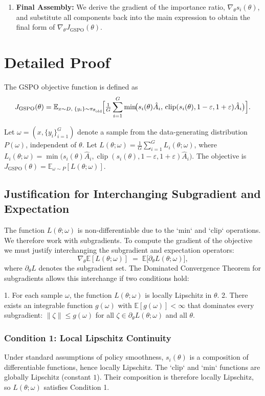 \documentclass{article}
\begin{document}
\begin{enumerate}
    \item \textbf{Final Assembly:} We derive the gradient of the importance ratio, $\nabla_\theta s_i(\theta)$, and substitute all components back into the main expression to obtain the final form of $\nabla_\theta J_{\text{GSPO}}(\theta)$.
\end{enumerate}
\section{Detailed Proof}

The GSPO objective function is defined as
$$
J_{\text{GSPO}}(\theta)=
\mathbb{E}_{x \sim D,\;\{y_i\}\sim\pi_{\theta_{\text{old}}}}
\!\Bigl[
\tfrac{1}{G}\sum_{i=1}^G
\min\!\bigl(
  s_i(\theta)\hat{A}_i,\,
  \operatorname{clip}(s_i(\theta),1-\varepsilon,1+\varepsilon)\hat{A}_i
\bigr)
\Bigr].
$$

Let $\omega=(x,\{y_i\}_{i=1}^G)$ denote a sample from the data-generating distribution $P(\omega)$, independent of $\theta$. Let  
$L(\theta;\omega)=\tfrac{1}{G}\sum_{i=1}^G L_i(\theta;\omega)$, where  
$L_i(\theta;\omega)=\min\!\bigl(s_i(\theta)\hat{A}_i,\operatorname{clip}(s_i(\theta),1-\varepsilon,1+\varepsilon)\hat{A}_i\bigr)$.  
The objective is $J_{\text{GSPO}}(\theta)=\mathbb{E}_{\omega\sim P}[L(\theta;\omega)]$.

\subsection{Justification for Interchanging Subgradient and Expectation}

The function $L(\theta;\omega)$ is non-differentiable due to the `min` and `clip` operations. We therefore work with subgradients. To compute the gradient of the objective we must justify interchanging the subgradient and expectation operators:
\[
\nabla_\theta\mathbb{E}[L(\theta;\omega)]
\;=\;
\mathbb{E}\!\bigl[\partial_\theta L(\theta;\omega)\bigr],
\]
where $\partial_\theta L$ denotes the subgradient set. The Dominated Convergence Theorem for subgradients allows this interchange if two conditions hold:

1. For each sample $\omega$, the function $L(\theta;\omega)$ is locally Lipschitz in $\theta$.  
2. There exists an integrable function $g(\omega)$ with $\mathbb{E}[g(\omega)]<\infty$ that dominates every subgradient: $\|\zeta\|\le g(\omega)$ for all $\zeta\in\partial_\theta L(\theta;\omega)$ and all $\theta$.

\subsubsection{Condition 1: Local Lipschitz Continuity}
Under standard assumptions of policy smoothness, $s_i(\theta)$ is a composition of differentiable functions, hence locally Lipschitz. The `clip` and `min` functions are globally Lipschitz (constant $1$). Their composition is therefore locally Lipschitz, so $L(\theta;\omega)$ satisfies Condition 1.
\end{document}
